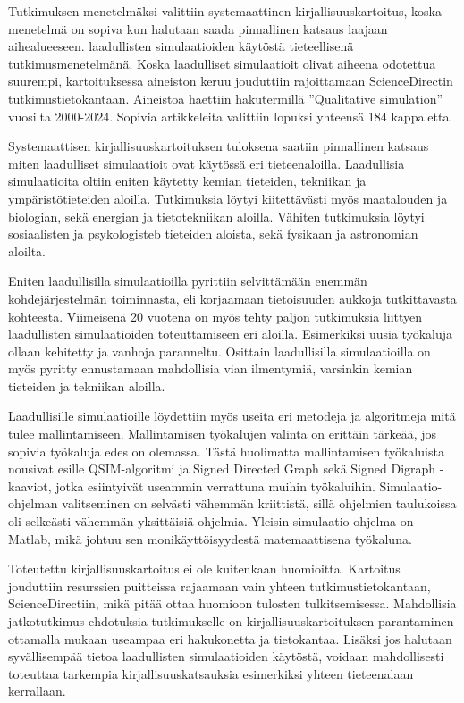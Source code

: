 \documentclass[utf8]{gradu3}
\begin{document}
Tutkimuksen menetelmäksi valittiin systemaattinen kirjallisuuskartoitus, koska
menetelmä on sopiva kun halutaan saada pinnallinen katsaus laajaan aihealueeseen.
laadullisten simulaatioiden käytöstä tieteellisenä tutkimusmenetelmänä.
Koska laadulliset simulaatioit olivat aiheena odotettua suurempi, 
kartoituksessa aineiston keruu jouduttiin rajoittamaan ScienceDirectin 
tutkimustietokantaan. Aineistoa haettiin hakutermillä ''Qualitative simulation''
vuosilta 2000-2024. Sopivia artikkeleita valittiin lopuksi yhteensä 184 kappaletta.

Systemaattisen kirjallisuuskartoituksen tuloksena saatiin pinnallinen katsaus miten 
laadulliset simulaatioit ovat käytössä eri tieteenaloilla. 
Laadullisia simulaatioita oltiin eniten käytetty kemian tieteiden, 
tekniikan ja ympäristötieteiden aloilla. Tutkimuksia löytyi kiitettävästi myös
maatalouden ja biologian, sekä energian ja tietotekniikan aloilla. 
Vähiten tutkimuksia löytyi sosiaalisten ja psykologisteb tieteiden aloista, sekä 
fysikaan ja astronomian aloilta.

Eniten laadullisilla simulaatioilla pyrittiin
selvittämään enemmän kohdejärjestelmän toiminnasta, eli korjaamaan tietoisuuden aukkoja
tutkittavasta kohteesta. Viimeisenä 20 vuotena on myös tehty paljon tutkimuksia liittyen 
laadullisten simulaatioiden toteuttamiseen eri aloilla. 
Esimerkiksi uusia työkaluja ollaan kehitetty ja vanhoja paranneltu.
Osittain laadullisilla simulaatioilla on myös pyritty ennustamaan mahdollisia vian 
ilmentymiä, varsinkin kemian tieteiden ja tekniikan aloilla.

Laadullisille simulaatioille löydettiin myös useita eri metodeja ja algoritmeja 
mitä tulee mallintamiseen. Mallintamisen työkalujen valinta on erittäin tärkeää,
jos sopivia työkaluja edes on olemassa. Tästä huolimatta mallintamisen työkaluista
nousivat esille QSIM-algoritmi ja Signed Directed Graph sekä Signed Digraph -kaaviot, 
jotka esiintyivät useammin verrattuna muihin työkaluihin.
Simulaatio-ohjelman valitseminen on selvästi vähemmän kriittistä, sillä ohjelmien taulukoissa
oli selkeästi vähemmän yksittäisiä ohjelmia. 
Yleisin simulaatio-ohjelma on Matlab, mikä johtuu sen monikäyttöisyydestä 
matemaattisena työkaluna.

Toteutettu kirjallisuuskartoitus ei ole kuitenkaan huomioitta. Kartoitus jouduttiin resurssien
puitteissa rajaamaan vain yhteen tutkimustietokantaan, ScienceDirectiin, 
mikä pitää ottaa huomioon tulosten tulkitsemisessa. Mahdollisia jatkotutkimus ehdotuksia
tutkimukselle on kirjallisuuskartoituksen parantaminen ottamalla mukaan useampaa eri 
hakukonetta ja tietokantaa. 
Lisäksi jos halutaan syvällisempää tietoa laadullisten simulaatioiden käytöstä, 
voidaan mahdollisesti toteuttaa tarkempia kirjallisuuskatsauksia esimerkiksi yhteen 
tieteenalaan kerrallaan.
\end{document}
